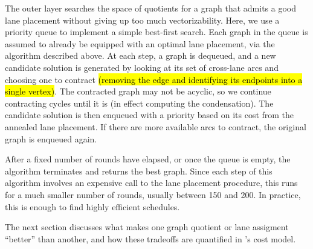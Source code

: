 The outer layer searches the space of quotients for a graph that admits a good lane placement without giving up too much vectorizability.
Here, we use a priority queue to implement a simple best-first search.
Each graph in the queue is assumed to already be equipped with an optimal lane placement, via the algorithm described above.
At each step, a graph is dequeued, and a new candidate solution is generated by looking at its set of cross-lane arcs and choosing one to contract \hl{(removing the edge and identifying its endpoints into a single vertex)}.
The contracted graph may not be acyclic, so we continue contracting cycles until it is (in effect computing the condensation). %
The candidate solution is then enqueued with a priority based on its cost from the annealed lane placement.
If there are more available arcs to contract, the original graph is enqueued again.

After a fixed number of rounds have elapsed, or once the queue is empty, the algorithm terminates and returns the best graph.
Since each step of this algorithm involves an expensive call to the lane placement procedure, this runs for a much smaller number of rounds, usually between 150 and 200.
In practice, this is enough to find highly efficient schedules.

The next section discusses what makes one graph quotient or lane assigment ``better'' than another, and how these tradeoffs are quantified in \system's cost model.

